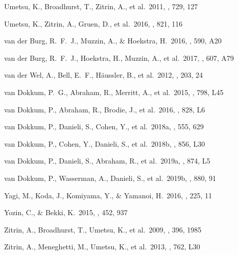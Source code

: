 \documentclass[iop,tighten,twocolumn,apj,floatfix]{emulateapj}
\begin{document}
\begin{thebibliography}{}
 Umetsu, K., Broadhurst, T., Zitrin, A., et al.\ 2011, \apj, 729, 127

 Umetsu, K., Zitrin, A.,
Gruen, D., et al.\ 2016, \apj, 821, 116

 van der Burg, R.~F.~J., Muzzin, A.,
\& Hoekstra, H.\ 2016, \aap, 590, A20

 van der Burg,
    R.~F.~J., Hoekstra, H., Muzzin, A., et al.\ 2017, \aap, 607, A79

 van der Wel, A., Bell,
E.~F., H{\"a}ussler, B., et al.\ 2012, \apjs, 203, 24

 van Dokkum, P.~G.,
Abraham, R., Merritt, A., et al.\ 2015, \apjl, 798, L45

 van Dokkum, P.,
Abraham, R., Brodie, J., et al.\ 2016, \apjl, 828, L6 

 van Dokkum, P., Danieli, S.,
    Cohen, Y., et al.\ 2018a, \nat, 555, 629

 van Dokkum, P., Cohen,
    Y., Danieli, S., et al.\ 2018b, \apjl, 856, L30

 van Dokkum, P., Danieli,
    S., Abraham, R., et al.\ 2019a, \apjl, 874, L5

 van Dokkum, P., Wasserman,
    A., Danieli, S., et al.\ 2019b, \apj, 880, 91

 Yagi, M., Koda, J., Komiyama, Y., \&
Yamanoi, H.\ 2016, \apjs, 225, 11 

 Yozin, C., \& Bekki, K.\
2015, \mnras, 452, 937

 Zitrin, A., Broadhurst, T.,
Umetsu, K., et al.\ 2009, \mnras, 396, 1985

 Zitrin, A., Meneghetti, M.,
Umetsu, K., et al.\ 2013, \apjl, 762, L30

\end{thebibliography}
\end{document}
